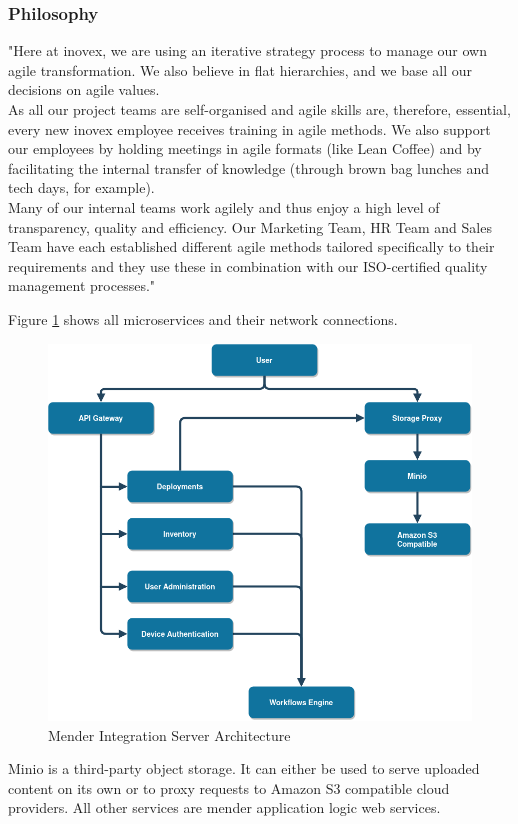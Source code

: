 \subsubsection{Philosophy}
"Here at inovex, we are using an iterative strategy process to manage our own agile transformation. We also believe in flat hierarchies, and we base all our decisions on agile values.\\
As all our project teams are self-organised and agile skills are, therefore, essential, every new inovex employee receives training in agile methods. We also support our employees by holding meetings in agile formats (like Lean Coffee) and by facilitating the internal transfer of knowledge (through brown bag lunches and tech days, for example).\\
Many of our internal teams work agilely and thus enjoy a high level of transparency, quality and efficiency. Our Marketing Team, HR Team and Sales Team have each established different agile methods tailored specifically to their requirements and they use these in combination with our ISO-certified quality management processes."\cite{inovex}

Figure \ref{fig:mender-integration} shows all microservices and their network connections.
\begin{figure}
    \centering
    \includegraphics[scale=0.5]{images/integration-app.png}
    \caption{Mender Integration Server Architecture}
    \label{fig:mender-integration}
\end{figure}
Minio is a third-party object storage. It can either be used to serve uploaded content on its own or to proxy requests to Amazon S3 compatible cloud providers. All other services are mender application logic web services.
\newpage


